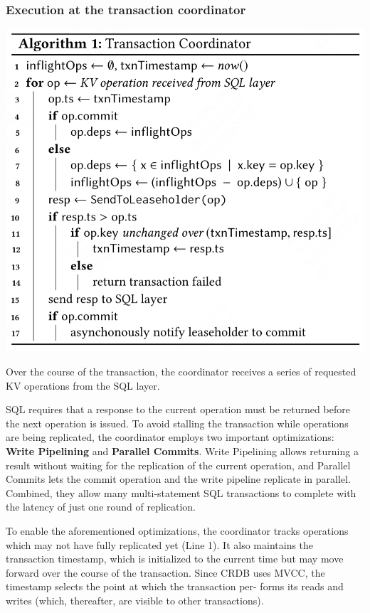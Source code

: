 \documentclass[11pt]{article}
\begin{document}
\subsubsection{Execution at the transaction coordinator}
\label{sec:orge05e9dd}
\begin{center}
\includegraphics[width=.8\textwidth]{../../images/papers/69.png}
\label{}
\end{center}
Over the course of the transaction, the coordinator receives a series of requested KV operations from
the SQL layer.

SQL requires that a response to the current operation must be returned before the next operation is
issued. To avoid stalling the transaction while operations are being replicated, the coordinator
employs two important optimizations: \textbf{Write Pipelining} and \textbf{Parallel Commits}. Write Pipelining allows
returning a result without waiting for the replication of the current operation, and Parallel Commits
lets the commit operation and the write pipeline replicate in parallel. Combined, they allow many
multi-statement SQL transactions to complete with the latency of just one round of replication.

To enable the aforementioned optimizations, the coordinator tracks operations which may not have fully
replicated yet (Line 1). It also maintains the transaction timestamp, which is initialized to the
current time but may move forward over the course of the transaction. Since CRDB uses MVCC, the
timestamp selects the point at which the transaction per- forms its reads and writes (which,
thereafter, are visible to other transactions).
\end{document}
